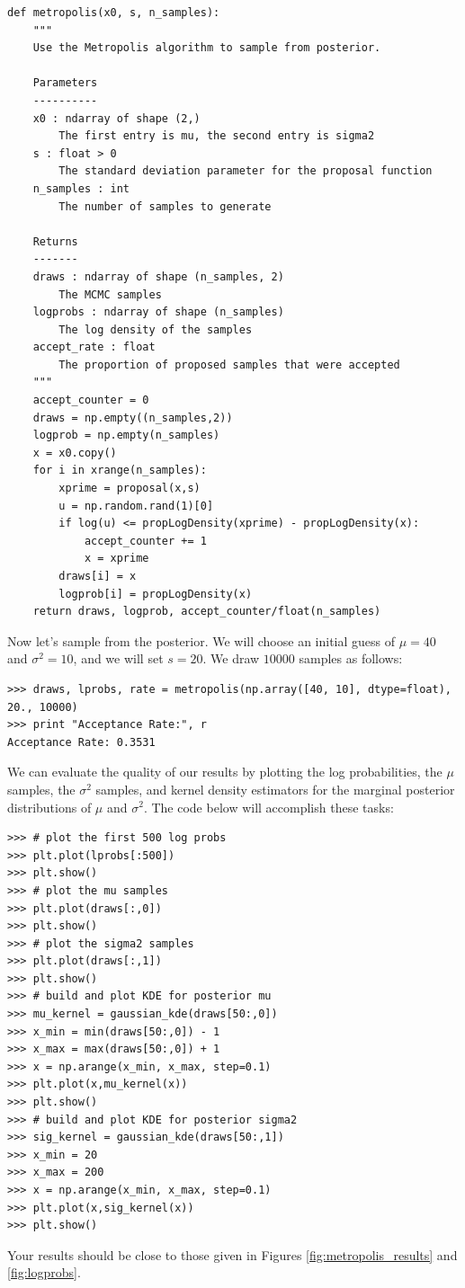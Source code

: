 \begin{lstlisting}
def metropolis(x0, s, n_samples):
    """
    Use the Metropolis algorithm to sample from posterior.

    Parameters
    ----------
    x0 : ndarray of shape (2,)
        The first entry is mu, the second entry is sigma2
    s : float > 0
        The standard deviation parameter for the proposal function
    n_samples : int
        The number of samples to generate

    Returns
    -------
    draws : ndarray of shape (n_samples, 2)
        The MCMC samples
    logprobs : ndarray of shape (n_samples)
        The log density of the samples
    accept_rate : float
        The proportion of proposed samples that were accepted
    """
    accept_counter = 0
    draws = np.empty((n_samples,2))
    logprob = np.empty(n_samples)
    x = x0.copy()
    for i in xrange(n_samples):
        xprime = proposal(x,s)
        u = np.random.rand(1)[0]
        if log(u) <= propLogDensity(xprime) - propLogDensity(x):
            accept_counter += 1
            x = xprime
        draws[i] = x
        logprob[i] = propLogDensity(x)
    return draws, logprob, accept_counter/float(n_samples)
\end{lstlisting}
Now let's sample from the posterior. We will choose an initial guess of $\mu=40$ and $\sigma^2=10$,
and we will set $s = 20$. We draw $10000$ samples as follows:
\begin{lstlisting}
>>> draws, lprobs, rate = metropolis(np.array([40, 10], dtype=float), 20., 10000)
>>> print "Acceptance Rate:", r
Acceptance Rate: 0.3531
\end{lstlisting}

We can evaluate the quality of our results by plotting the log probabilities, the $\mu$ samples, the $\sigma^2$ samples,
and kernel density estimators for the marginal posterior distributions of $\mu$ and $\sigma^2$. The code
below will accomplish these tasks:
\begin{lstlisting}
>>> # plot the first 500 log probs
>>> plt.plot(lprobs[:500])
>>> plt.show()
>>> # plot the mu samples
>>> plt.plot(draws[:,0])
>>> plt.show()
>>> # plot the sigma2 samples
>>> plt.plot(draws[:,1])
>>> plt.show()
>>> # build and plot KDE for posterior mu
>>> mu_kernel = gaussian_kde(draws[50:,0])
>>> x_min = min(draws[50:,0]) - 1
>>> x_max = max(draws[50:,0]) + 1
>>> x = np.arange(x_min, x_max, step=0.1)
>>> plt.plot(x,mu_kernel(x))
>>> plt.show()
>>> # build and plot KDE for posterior sigma2
>>> sig_kernel = gaussian_kde(draws[50:,1])
>>> x_min = 20
>>> x_max = 200
>>> x = np.arange(x_min, x_max, step=0.1)
>>> plt.plot(x,sig_kernel(x))
>>> plt.show()
\end{lstlisting}
Your results should be close to those given in Figures \ref{fig:metropolis_results} and \ref{fig:logprobs}.

